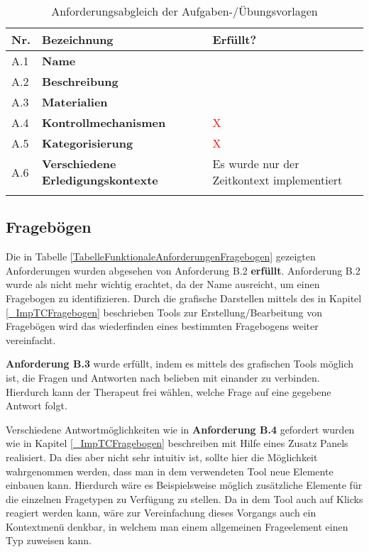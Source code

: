 \begin{table}[htbp]
	\begin{center}
		\begin{tabular}{p{} p{} p{}}
			\rowcolor{black!20} \textbf{Nr.} & \textbf{Bezeichnung} & \textbf{Erfüllt?} \\ \toprule 
			A.1 & \textbf{Name} & \textcolor{green}{\checkmark} \\ \hline \addlinespace
			A.2 & \textbf{Beschreibung} & \textcolor{green}{\checkmark} \\ \hline \addlinespace
			A.3 & \textbf{Materialien} & \textcolor{green}{\checkmark} \\ \hline \addlinespace
			A.4 & \textbf{Kontrollmechanismen} & \textcolor{red}{X} \\ \hline \addlinespace
			A.5 & \textbf{Kategorisierung} & \textcolor{red}{X}  \\ \hline \addlinespace
			A.6 & \textbf{Verschiedene Erledigungskontexte} & Es wurde nur der Zeitkontext implementiert \\ \hline \addlinespace
		\end{tabular}
	\end{center}
	\caption[Anforderungsabgleich der Aufgaben-/Übungsvorlagen]{Anforderungsabgleich der Aufgaben-/Übungsvorlagen}
	\label{TabelleAnforderungsabgleichVorlagen}
\end{table}

\subsection{Fragebögen}
Die in Tabelle \ref{TabelleFunktionaleAnforderungenFragebogen} gezeigten Anforderungen wurden abgesehen von Anforderung B.2 \textbf{erfüllt}. Anforderung B.2 wurde als nicht mehr wichtig erachtet, da der Name ausreicht, um einen Fragebogen zu identifizieren. Durch die grafische Darstellen mittels des in Kapitel \ref{_ImpTCFragebogen} beschrieben Tools zur Erstellung/Bearbeitung von Fragebögen wird das wiederfinden eines bestimmten Fragebogens weiter vereinfacht.

\textbf{Anforderung B.3} wurde erfüllt, indem es mittels des grafischen Tools möglich ist, die Fragen und Antworten nach belieben mit einander zu verbinden. Hierdurch kann der Therapeut frei wählen, welche Frage auf eine gegebene Antwort folgt.

Verschiedene Antwortmöglichkeiten wie in \textbf{Anforderung B.4} gefordert wurden wie in Kapitel \ref{_ImpTCFragebogen} beschreiben mit Hilfe eines Zusatz Panels realisiert. Da dies aber nicht sehr intuitiv ist, sollte hier die Möglichkeit wahrgenommen werden, dass man in dem verwendeten Tool neue Elemente einbauen kann. Hierdurch wäre es Beispielsweise möglich zusätzliche Elemente für die einzelnen Fragetypen zu Verfügung zu stellen. Da in dem Tool auch auf Klicks reagiert werden kann, wäre zur Vereinfachung dieses Vorgangs auch ein Kontextmenü denkbar, in welchem man einem allgemeinen Frageelement einen Typ zuweisen kann.

